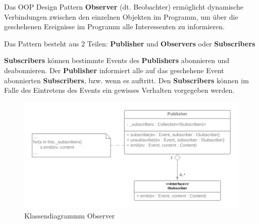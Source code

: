 Das OOP Design Pattern \textbf{Observer} (dt. Beobachter) ermöglicht dynamische Verbindungen zwischen den einzelnen 
Objekten im Programm, um über die geschehenen Ereignisse im Programm alle Interessenten 
zu informieren.

Das Pattern besteht aus 2 Teilen: \textbf{Publisher} und \textbf{Observers} oder \textbf{Subscribers}

\textbf{Subscribers} können bestimmte Events des \textbf{Publishers} abonnieren und deabonnieren. 
Der \textbf{Publisher} informiert alle auf das geschehene Event abonnierten \textbf{Subscribers}, bzw. wenn es auftritt. 
Den \textbf{Subscribers} können im Falle des Eintretens des Events ein gewisses Verhalten vorgegeben werden.

\begin{figure}[H]
    \centering
    \includegraphics[width=1\textwidth]{Images/Observer.png}
    \caption[UML Observer]{Klassendiagrammm Observer}
    \label{fig:cd_observer}
\end{figure}